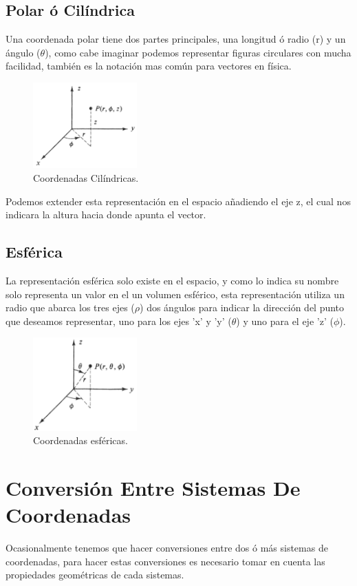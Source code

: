 \documentclass{article}
\begin{document}
\subsection{Polar ó Cilíndrica}
\label{sec:org23202eb}
Una coordenada polar tiene dos partes principales, una longitud ó radio (r) y un ángulo (\(\theta\)), como cabe imaginar podemos representar figuras circulares con mucha facilidad, también es la notación mas común para vectores en física.

\begin{figure}[htbp]
\centering
\includegraphics[width=4cm]{img/coordenadas-cilindricas.png}
\caption{Coordenadas Cilíndricas.}
\end{figure}

Podemos extender esta representación en el espacio añadiendo el eje z, el cual nos indicara la altura hacia donde apunta el vector.

\subsection{Esférica}
\label{sec:orgc69214d}
La representación esférica solo existe en el espacio, y como lo indica su nombre solo representa un valor en el un volumen esférico, esta representación utiliza un radio que abarca los tres ejes (\(\rho\)) dos ángulos para indicar la dirección del punto que deseamos representar, uno para los ejes 'x' y 'y' (\(\theta\)) y uno para el eje 'z' (\(\phi\)).

\begin{figure}[htbp]
\centering
\includegraphics[width=4cm]{img/coordenadas-esfericas.png}
\caption{Coordenadas esféricas.}
\end{figure}


\section{Conversión Entre Sistemas De Coordenadas}
\label{sec:orgc26825c}
Ocasionalmente tenemos que hacer conversiones entre dos ó más sistemas de coordenadas, para hacer estas conversiones es necesario tomar en cuenta las propiedades geométricas de cada sistemas.
\end{document}

